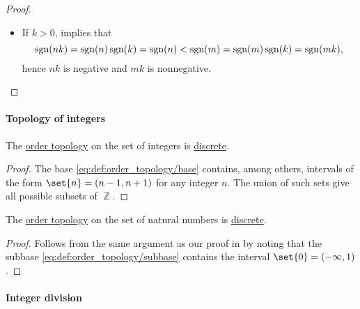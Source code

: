 \begin{proof}
\begin{itemize}
\begin{itemize}
        \item If \( k > 0 \),  implies that
        \begin{equation*}
          \operatorname{sgn}(nk) = \operatorname{sgn}(n) \operatorname{sgn}(k) = \operatorname{sgn}(n) < \operatorname{sgn}(m) = \operatorname{sgn}(m) \operatorname{sgn}(k) = \operatorname{sgn}(mk),
        \end{equation*}
        hence \( nk \) is negative and \( mk \) is nonnegative.
    \end{itemize}
  \end{itemize}
\end{proof}

\paragraph{Topology of integers}

\begin{proposition}\label{thm:order_topology_on_integers_is_discrete}
  The \hyperref[def:order_topology]{order topology} on the set of integers is \hyperref[def:discrete_topology]{discrete}.
\end{proposition}
\begin{proof}
  The base \eqref{eq:def:order_topology/base} contains, among others, intervals of the form \( \set{ n } = (n - 1, n + 1) \) for any integer \( n \). The union of such sets give all possible subsets of \( \BbbZ \).
\end{proof}

\begin{corollary}\label{thm:order_topology_on_natural_numbers_is_discrete}
  The \hyperref[def:order_topology]{order topology} on the set of natural numbers is \hyperref[def:discrete_topology]{discrete}.
\end{corollary}
\begin{proof}
  Follows from the same argument as our proof in  by noting that the subbase \eqref{eq:def:order_topology/subbase} contains the interval \( \set{ 0 } = (-\infty, 1) \).
\end{proof}

\paragraph{Integer division}

